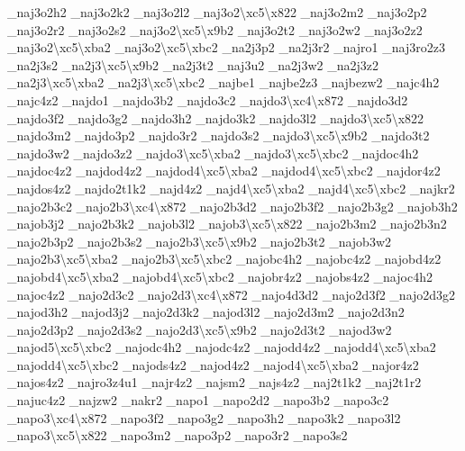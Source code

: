 {\-\_\-naj3o2h2 \-\_\-naj3o2k2 \-\_\-naj3o2l2 \-\_\-naj3o2\textbackslash{}xc5\textbackslash{}x822 \-\_\-naj3o2m2 \-\_\-naj3o2p2 \-\_\-naj3o2r2 \-\_\-naj3o2s2 \-\_\-naj3o2\textbackslash{}xc5\textbackslash{}x9b2 \-\_\-naj3o2t2 \-\_\-naj3o2w2 \-\_\-naj3o2z2 \-\_\-naj3o2\textbackslash{}xc5\textbackslash{}xba2 \-\_\-naj3o2\textbackslash{}xc5\textbackslash{}xbc2 \-\_\-na2j3p2 \-\_\-na2j3r2 \-\_\-najro1 \-\_\-naj3ro2z3 \-\_\-na2j3s2 \-\_\-na2j3\textbackslash{}xc5\textbackslash{}x9b2 \-\_\-na2j3t2 \-\_\-naj3u2 \-\_\-na2j3w2 \-\_\-na2j3z2 \-\_\-na2j3\textbackslash{}xc5\textbackslash{}xba2 \-\_\-na2j3\textbackslash{}xc5\textbackslash{}xbc2 \-\_\-najbe1 \-\_\-najbe2z3 \-\_\-najbezw2 \-\_\-najc4h2 \-\_\-najc4z2 \-\_\-najdo1 \-\_\-najdo3b2 \-\_\-najdo3c2 \-\_\-najdo3\textbackslash{}xc4\textbackslash{}x872 \-\_\-najdo3d2 \-\_\-najdo3f2 \-\_\-najdo3g2 \-\_\-najdo3h2 \-\_\-najdo3k2 \-\_\-najdo3l2 \-\_\-najdo3\textbackslash{}xc5\textbackslash{}x822 \-\_\-najdo3m2 \-\_\-najdo3p2 \-\_\-najdo3r2 \-\_\-najdo3s2 \-\_\-najdo3\textbackslash{}xc5\textbackslash{}x9b2 \-\_\-najdo3t2 \-\_\-najdo3w2 \-\_\-najdo3z2 \-\_\-najdo3\textbackslash{}xc5\textbackslash{}xba2 \-\_\-najdo3\textbackslash{}xc5\textbackslash{}xbc2 \-\_\-najdoc4h2 \-\_\-najdoc4z2 \-\_\-najdod4z2 \-\_\-najdod4\textbackslash{}xc5\textbackslash{}xba2 \-\_\-najdod4\textbackslash{}xc5\textbackslash{}xbc2 \-\_\-najdor4z2 \-\_\-najdos4z2 \-\_\-najdo2t1k2 \-\_\-najd4z2 \-\_\-najd4\textbackslash{}xc5\textbackslash{}xba2 \-\_\-najd4\textbackslash{}xc5\textbackslash{}xbc2 \-\_\-najkr2 \-\_\-najo2b3c2 \-\_\-najo2b3\textbackslash{}xc4\textbackslash{}x872 \-\_\-najo2b3d2 \-\_\-najo2b3f2 \-\_\-najo2b3g2 \-\_\-najob3h2 \-\_\-najob3j2 \-\_\-najo2b3k2 \-\_\-najob3l2 \-\_\-najob3\textbackslash{}xc5\textbackslash{}x822 \-\_\-najo2b3m2 \-\_\-najo2b3n2 \-\_\-najo2b3p2 \-\_\-najo2b3s2 \-\_\-najo2b3\textbackslash{}xc5\textbackslash{}x9b2 \-\_\-najo2b3t2 \-\_\-najob3w2 \-\_\-najo2b3\textbackslash{}xc5\textbackslash{}xba2 \-\_\-najo2b3\textbackslash{}xc5\textbackslash{}xbc2 \-\_\-najobc4h2 \-\_\-najobc4z2 \-\_\-najobd4z2 \-\_\-najobd4\textbackslash{}xc5\textbackslash{}xba2 \-\_\-najobd4\textbackslash{}xc5\textbackslash{}xbc2 \-\_\-najobr4z2 \-\_\-najobs4z2 \-\_\-najoc4h2 \-\_\-najoc4z2 \-\_\-najo2d3c2 \-\_\-najo2d3\textbackslash{}xc4\textbackslash{}x872 \-\_\-najo4d3d2 \-\_\-najo2d3f2 \-\_\-najo2d3g2 \-\_\-najod3h2 \-\_\-najod3j2 \-\_\-najo2d3k2 \-\_\-najod3l2 \-\_\-najo2d3m2 \-\_\-najo2d3n2 \-\_\-najo2d3p2 \-\_\-najo2d3s2 \-\_\-najo2d3\textbackslash{}xc5\textbackslash{}x9b2 \-\_\-najo2d3t2 \-\_\-najod3w2 \-\_\-najod5\textbackslash{}xc5\textbackslash{}xbc2 \-\_\-najodc4h2 \-\_\-najodc4z2 \-\_\-najodd4z2 \-\_\-najodd4\textbackslash{}xc5\textbackslash{}xba2 \-\_\-najodd4\textbackslash{}xc5\textbackslash{}xbc2 \-\_\-najods4z2 \-\_\-najod4z2 \-\_\-najod4\textbackslash{}xc5\textbackslash{}xba2 \-\_\-najor4z2 \-\_\-najos4z2 \-\_\-najro3z4u1 \-\_\-najr4z2 \-\_\-najsm2 \-\_\-najs4z2 \-\_\-naj2t1k2 \-\_\-naj2t1r2 \-\_\-najuc4z2 \-\_\-najzw2 \-\_\-nakr2 \-\_\-napo1 \-\_\-napo2d2 \-\_\-napo3b2 \-\_\-napo3c2 \-\_\-napo3\textbackslash{}xc4\textbackslash{}x872 \-\_\-napo3f2 \-\_\-napo3g2 \-\_\-napo3h2 \-\_\-napo3k2 \-\_\-napo3l2 \-\_\-napo3\textbackslash{}xc5\textbackslash{}x822 \-\_\-napo3m2 \-\_\-napo3p2 \-\_\-napo3r2 \-\_\-napo3s2 }
